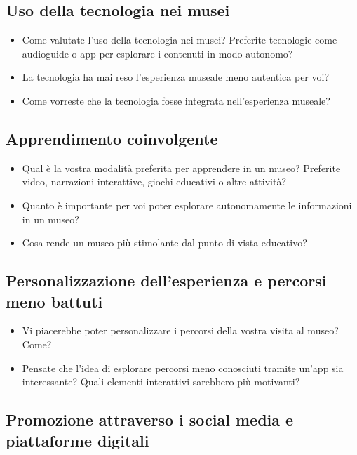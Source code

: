 \documentclass{article}
\begin{document}
\subsection{Uso della tecnologia nei musei}

\begin{itemize}
    \item Come valutate l’uso della tecnologia nei musei? Preferite tecnologie come audioguide o app per esplorare i contenuti in modo autonomo?
    \item La tecnologia ha mai reso l’esperienza museale meno autentica per voi?
    \item Come vorreste che la tecnologia fosse integrata nell’esperienza museale?
\end{itemize}

\subsection{Apprendimento coinvolgente}

\begin{itemize}
    \item Qual è la vostra modalità preferita per apprendere in un museo? Preferite video, narrazioni interattive, giochi educativi o altre attività?
    \item Quanto è importante per voi poter esplorare autonomamente le informazioni in un museo?
    \item Cosa rende un museo più stimolante dal punto di vista educativo?
\end{itemize}

\subsection{Personalizzazione dell’esperienza e percorsi meno battuti}

\begin{itemize}
    \item Vi piacerebbe poter personalizzare i percorsi della vostra visita al museo? Come?
    \item Pensate che l’idea di esplorare percorsi meno conosciuti tramite un’app sia interessante? Quali elementi interattivi sarebbero più motivanti?
\end{itemize}

\subsection{Promozione attraverso i social media e piattaforme digitali}
\end{document}
